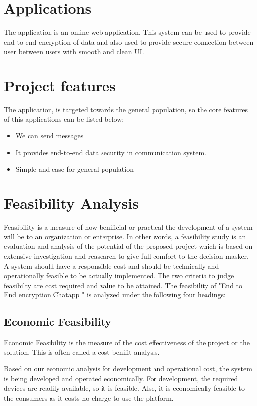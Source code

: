 \section{Applications}
The application is an online web application. This system can be used to provide end to end encryption of data and also used to provide secure connection between user between users with smooth and clean UI.

\section{Project features}
The application, is targeted towards the general population, so the core features of this applications can be listed below:

\vspace{-18pt}
\begin{itemize}
	\item We can send messages
	\item It provides end-to-end data security in communication system.
	\item Simple and ease for general population
\end{itemize}

\section{Feasibility Analysis}
Feasibility is a measure of how benificial or practical the development of a system will be to an organization or enterprise.
In other words, a feasibility study is an evaluation and analysis of the potential of the proposed project which is based on extensive investigation and reasearch to give
full comfort to the decision masker. A system should have a responsible cost and should be technically and operationally feasible to be actually implemented.
The two criteria to judge feasibilty are cost required and value to be attained. The feasibility of "End to End encryption Chatapp " is analyzed under the following four headings:

\subsection{Economic Feasibility}
Economic Feasibility is the measure of the cost effectiveness of the project or the solution. This is often called a cost benifit analysis. \par
Based on our economic analysis for development and operational cost,
the system is being developed and operated economically. For development,
the required devices are readily available, so it is feasible. Also,
it is economically feasible to the consumers as it costs no charge to use the platform.

